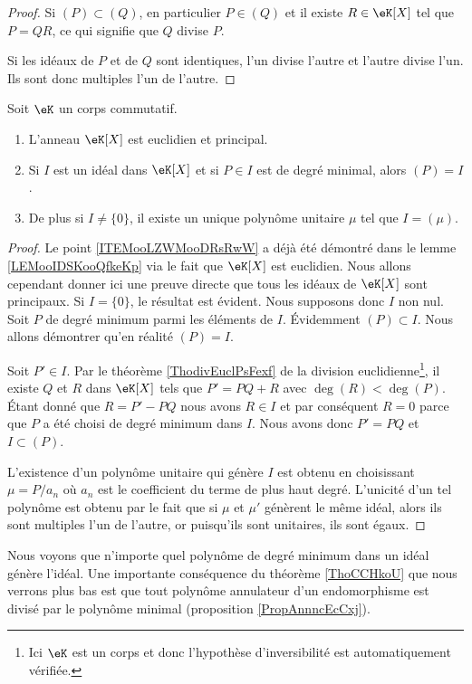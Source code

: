 \begin{proof}
    Si \( (P)\subset (Q)\), en particulier \( P\in(Q)\) et il existe \( R\in\eK[X]\) tel que \( P=QR\), ce qui signifie que \( Q\) divise \( P\).

    Si les idéaux de \( P\) et de \( Q\) sont identiques, l'un divise l'autre et l'autre divise l'un. Ils sont donc multiples l'un de l'autre.
\end{proof}

\begin{theorem}     \label{ThoCCHkoU}
    Soit \( \eK\) un corps commutatif.
    \begin{enumerate}
        \item       \label{ITEMooLZWMooDRsRwW}
            L'anneau \( \eK[X]\) est euclidien et principal. 
        \item
            Si \( I\) est un idéal dans \( \eK[X]\) et si \( P \in I\) est de degré minimal, alors \( (P)=I\).
        \item   \label{ITEMooASHKooZqkiCH}
            De plus si \( I\neq \{  0\}\), il existe un unique polynôme unitaire \( \mu\) tel que \( I=(\mu)\).
    \end{enumerate}
\end{theorem}

\begin{proof}
    Le point \ref{ITEMooLZWMooDRsRwW} a déjà été démontré dans le lemme \ref{LEMooIDSKooQfkeKp} via le fait que \( \eK[X]\) est euclidien. Nous allons cependant donner ici une preuve directe que tous les idéaux de \( \eK[X]\) sont principaux. Si \( I=\{ 0 \}\), le résultat est évident. Nous supposons donc \( I\) non nul. Soit \( P\) de degré minimum parmi les éléments de \( I\). Évidemment \( (P)\subset I\). Nous allons démontrer qu'en réalité \( (P)=I\).

    Soit \( P'\in I\). Par le théorème \ref{ThodivEuclPsFexf} de la division euclidienne\footnote{Ici \( \eK\) est un corps et donc l'hypothèse d'inversibilité est automatiquement vérifiée.}, il existe \( Q\) et \( R\) dans \( \eK[X]\) tels que \( P'=PQ+R\) avec \( \deg(R)<\deg(P)\). Étant donné que \( R=P'-PQ\) nous avons \( R\in I\) et par conséquent \( R=0\) parce que \( P\) a été choisi de degré minimum dans \( I\). Nous avons donc \( P'=PQ\) et \( I\subset (P)\).

    L'existence d'un polynôme unitaire qui génère \( I\) est obtenu en choisissant \( \mu =P/a_n\) où \( a_n\) est le coefficient du terme de plus haut degré. L'unicité d'un tel polynôme est obtenu par le fait que si \( \mu \) et \( \mu' \) génèrent le même idéal, alors ils sont multiples l'un de l'autre, or puisqu'ils sont unitaires, ils sont égaux.
\end{proof}
Nous voyons que n'importe quel polynôme de degré minimum dans un idéal génère l'idéal. Une importante conséquence du théorème \ref{ThoCCHkoU} que nous verrons plus bas est que tout polynôme annulateur d'un endomorphisme est divisé par le polynôme minimal (proposition \ref{PropAnnncEcCxj}).

